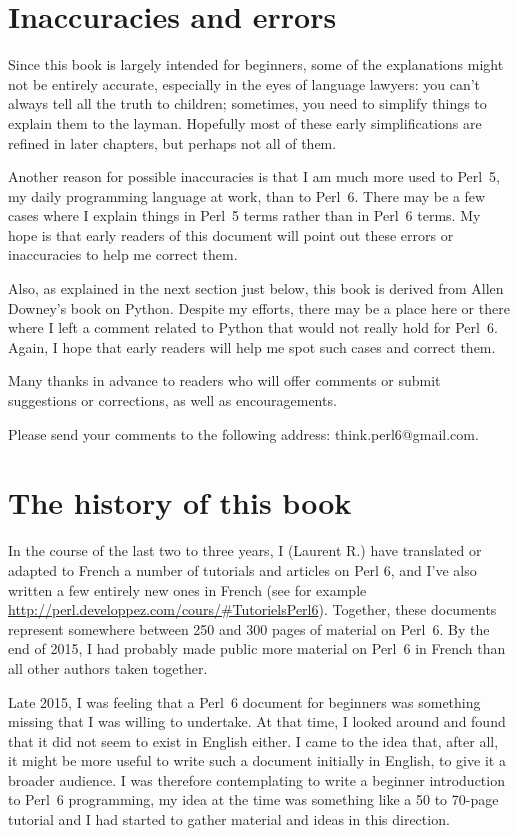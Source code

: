 \section*{Inaccuracies and errors}

Since this book is largely intended for beginners, some of 
the explanations might not be entirely accurate, especially 
in the eyes of language lawyers: you can't always tell all 
the truth to children; sometimes, you need to simplify things 
to explain them to the layman. Hopefully most of these early 
simplifications are refined in later chapters, but perhaps 
not all of them.

Another reason for possible inaccuracies is that I am much 
more used to Perl~5, my daily programming language at work, 
than to Perl~6. There may be a few cases where I explain 
things in Perl~5 terms rather than in Perl~6 terms. My hope 
is that early readers of this document will point out these 
errors or inaccuracies to help me correct them.

Also, as explained in the next section just below, this book
is derived from Allen Downey's book on Python. Despite 
my efforts, there may be a place here or there where I left 
a comment related to Python that would not really hold for Perl~6. 
Again, I hope that early readers will help me spot such 
cases and correct them.

Many thanks in advance to readers who will offer comments 
or submit suggestions or corrections, as well as encouragements.

Please send your comments to the following address: 
think.perl6@gmail.com.

\section*{The history of this book}

In the course of the last two to three years, I (Laurent R.) 
have translated or adapted to French a number of tutorials 
and articles on Perl 6, and I've also written a few entirely 
new ones in French (see for example 
\url{http://perl.developpez.com/cours/#TutorielsPerl6}). 
Together, these documents represent somewhere between 250 and 300 pages of material on Perl~6. By the end of 2015, I had 
probably made public more material on Perl~6 in French than 
all other authors taken together.

Late 2015, I was feeling that a Perl~6 document for beginners 
was something missing that I was willing to undertake. At that 
time, I looked around and found that it did not seem to 
exist in English either. I came to the idea that, after all, 
it might be more useful to write such a document initially 
in English, to give it a broader audience. I was therefore 
contemplating to write a beginner introduction to Perl~6 
programming, my idea at the time was something like a 50 to 
70-page tutorial and I had started to gather material and ideas 
in this direction.

